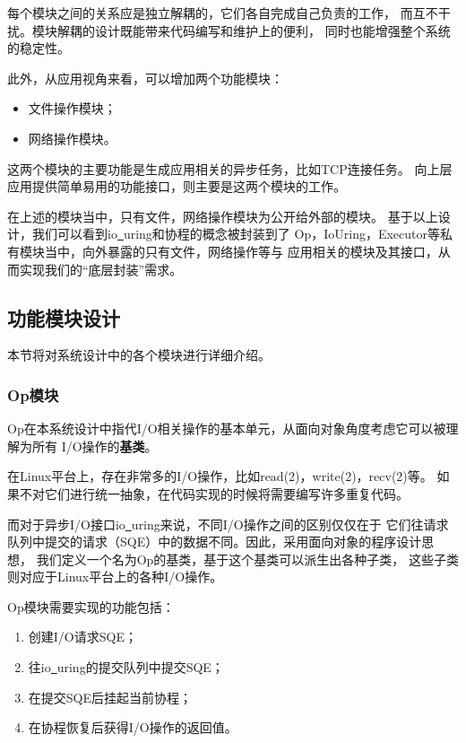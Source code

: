 \documentclass[supercite]{HustGraduPaper}
\theoremstyle{definition}
\begin{document}
每个模块之间的关系应是独立解耦的，它们各自完成自己负责的工作，
而互不干扰。模块解耦的设计既能带来代码编写和维护上的便利，
同时也能增强整个系统的稳定性。\par

此外，从应用视角来看，可以增加两个功能模块：

\begin{itemize}
  \item 文件操作模块；
  \item 网络操作模块。
\end{itemize}

这两个模块的主要功能是生成应用相关的异步任务，比如TCP连接任务。
向上层应用提供简单易用的功能接口，则主要是这两个模块的工作。\par

在上述的模块当中，只有文件，网络操作模块为公开给外部的模块。
基于以上设计，我们可以看到io\underline{~}uring和协程的概念被封装到了
Op，IoUring，Executor等私有模块当中，向外暴露的只有文件，网络操作等与
应用相关的模块及其接口，从而实现我们的“底层封装”需求。\par

\subsection{功能模块设计}
本节将对系统设计中的各个模块进行详细介绍。\par

\subsubsection{Op模块}

Op在本系统设计中指代I/O相关操作的基本单元，从面向对象角度考虑它可以被理解为所有
I/O操作的\textbf{基类}。\par

在Linux平台上，存在非常多的I/O操作，比如read(2)，write(2)，recv(2)等。
如果不对它们进行统一抽象，在代码实现的时候将需要编写许多重复代码。\par

而对于异步I/O接口io\underline{~}uring来说，不同I/O操作之间的区别仅仅在于
它们往请求队列中提交的请求（SQE）中的数据不同。因此，采用面向对象的程序设计思想，
我们定义一个名为Op的基类，基于这个基类可以派生出各种子类，
这些子类则对应于Linux平台上的各种I/O操作。\par

Op模块需要实现的功能包括：

\begin{enumerate}
  \item 创建I/O请求SQE；
  \item 往io\underline{~}uring的提交队列中提交SQE；
  \item 在提交SQE后挂起当前协程；
  \item 在协程恢复后获得I/O操作的返回值。
\end{enumerate}
\end{document}
